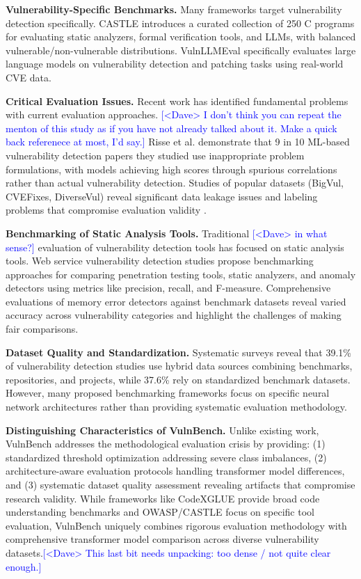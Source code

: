 \documentclass[letterpaper]{article}
\newcommand{\note}[2][red]{\textcolor{#1}{#2}}
\newcommand{\notedme}[1]{\note[blue]{[<Dave> #1]}}
\newcommand{\change}[2][]{\textcolor{orange}{#2}}
\begin{document}
\textbf{Vulnerability-Specific Benchmarks.} Many frameworks target vulnerability detection specifically. CASTLE \citep{castle2025} introduces a curated collection of 250 \change[compilable ]{}C programs for evaluating static analyzers, formal verification tools, and LLMs, with balanced vulnerable/non-vulnerable distributions. VulnLLMEval \citep{vulnllmeval2024} specifically evaluates large language models on vulnerability detection and patching tasks using real-world CVE data.

\textbf{Critical Evaluation Issues.} Recent work has identified fundamental problems with current evaluation approaches. \notedme{I don't think you can repeat the menton of this study as if you have not already talked about it. Make a quick back referenece at most, I'd say.} Risse et al. \citep{risse2025top} demonstrate that 9 in 10 ML-based vulnerability detection papers they studied use inappropriate problem formulations, with models achieving high scores through spurious correlations rather than actual vulnerability detection. Studies of popular datasets (BigVul, CVEFixes, DiverseVul) reveal significant data leakage issues and labeling problems that compromise evaluation validity \citep{ullah2024vulnerability}.

\textbf{Benchmarking of Static Analysis Tools.} Traditional \notedme{in what sense?} evaluation of vulnerability detection tools has focused on static analysis tools. Web service vulnerability detection studies \citep{antunes2010benchmarking} propose benchmarking approaches for comparing penetration testing tools, static analyzers, and anomaly detectors using metrics like precision, recall, and F-measure. Comprehensive evaluations of memory error detectors \citep{zhang2021evaluating} against benchmark datasets reveal varied accuracy across vulnerability categories and highlight the challenges of making fair comparisons.

\textbf{Dataset Quality and Standardization.} Systematic surveys \citep{systematic2024survey} reveal that 39.1\% of vulnerability detection studies use hybrid data sources combining benchmarks, repositories, and projects, while 37.6\% rely on standardized benchmark datasets. However, many proposed benchmarking frameworks \citep{lin2020deep} focus on specific neural network architectures rather than providing systematic evaluation methodology.

\textbf{Distinguishing Characteristics of VulnBench.} Unlike existing work, VulnBench addresses the methodological evaluation crisis by providing: (1) standardized threshold optimization addressing severe class imbalances, (2) architecture-aware evaluation protocols handling transformer model differences, and (3) systematic dataset quality assessment revealing artifacts that compromise research validity. While frameworks like CodeXGLUE provide broad code understanding benchmarks and OWASP/CASTLE focus on specific tool evaluation, VulnBench uniquely combines rigorous evaluation methodology with comprehensive transformer model comparison across diverse vulnerability datasets.\notedme{This last bit needs unpacking: too dense / not quite clear enough.}
\end{document}
